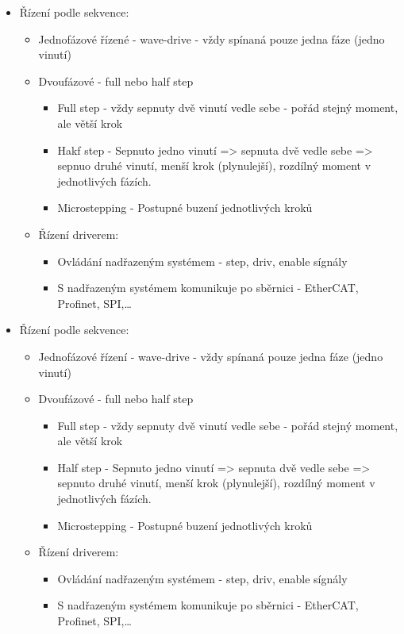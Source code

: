 \begin{itemize}
  \item Řízení podle sekvence: \begin{itemize}
    \item Jednofázové řízené - wave-drive - vždy spínaná pouze jedna fáze (jedno vinutí)
    \item Dvoufázové - full nebo half step\begin{itemize}
      \item Full step - vždy sepnuty dvě vinutí vedle sebe - pořád stejný moment, ale větší krok
      \item Hakf step - Sepnuto jedno vinutí => sepnuta dvě vedle sebe => sepnuo druhé vinutí, menší krok (plynulejší), rozdílný moment v jednotlivých fázích.
      \item Microstepping - Postupné buzení jednotlivých kroků
    \end{itemize}
  \item Řízení driverem: \begin{itemize}
    \item Ovládání nadřazeným systémem - step, driv, enable sígnály
    \item S nadřazeným systémem komunikuje po sběrnici - EtherCAT, Profinet, SPI,\dots
  \end{itemize}
  \end{itemize}
    \item Řízení podle sekvence: \begin{itemize}
              \item Jednofázové řízení - wave-drive - vždy spínaná pouze jedna fáze (jedno vinutí)
              \item Dvoufázové - full nebo half step\begin{itemize}
                        \item Full step - vždy sepnuty dvě vinutí vedle sebe - pořád stejný moment, ale větší krok
                        \item Half step - Sepnuto jedno vinutí => sepnuta dvě vedle sebe => sepnuto druhé vinutí, menší krok (plynulejší), rozdílný moment v jednotlivých fázích.
                        \item Microstepping - Postupné buzení jednotlivých kroků
                    \end{itemize}
              \item Řízení driverem: \begin{itemize}
                        \item Ovládání nadřazeným systémem - step, driv, enable sígnály
                        \item S nadřazeným systémem komunikuje po sběrnici - EtherCAT, Profinet, SPI,\dots
                    \end{itemize}
          \end{itemize}
\end{itemize}

